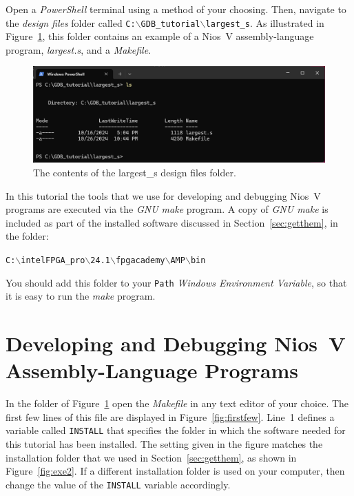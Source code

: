 \documentclass[11pt, twoside, pdftex]{article}
\begin{document}
{Open a {\it PowerShell} terminal using a method of your choosing.  Then, navigate to the 
{\it design files} folder called \texttt{C:$\backslash$GDB\_tutorial$\backslash$largest\_s}. 
As illustrated in Figure~\ref{fig:largest1}, this folder contains an example of a 
Nios~V assembly-language program, {\it largest.s}, and a {\it Makefile}. 
~\\
\begin{figure}[h]
    \begin{center}
        \includegraphics[width=.9\linewidth]{figures/largest1.png}
        \caption{The contents of the largest\_s design files folder.}
        \label{fig:largest1}
    \end{center}
\end{figure}

In this tutorial the tools that we use for developing and debugging Nios~V programs are 
executed via the {\it GNU make} program. A copy of {\it GNU make} is included as part of
the installed software discussed in Section~\ref{sec:getthem}, in the folder:

\texttt{C:$\backslash$intelFPGA\_pro$\backslash$24.1$\backslash$fpgacademy$\backslash$AMP$\backslash$bin}

You should add this folder to your \texttt{Path} {\it Windows Environment Variable}, so
that it is easy to run the {\it make} program.  

\section{Developing and Debugging Nios~V Assembly-Language Programs}
\label{sec:assembly}

In the folder of Figure~\ref{fig:largest1} open the {\it Makefile} in any text editor of your
choice. The first few lines of this file are displayed in Figure~\ref{fig:firstfew}.
Line~1 defines a variable called \texttt{INSTALL} that specifies the folder in which the 
software needed for this tutorial has been installed. The setting given in the figure matches 
the installation folder that we used in Section~\ref{sec:getthem}, as shown in 
Figure~\ref{fig:exe2}. If a different installation folder is used on your computer, then 
change the value of the \texttt{INSTALL} variable accordingly. 

}
\end{document}
